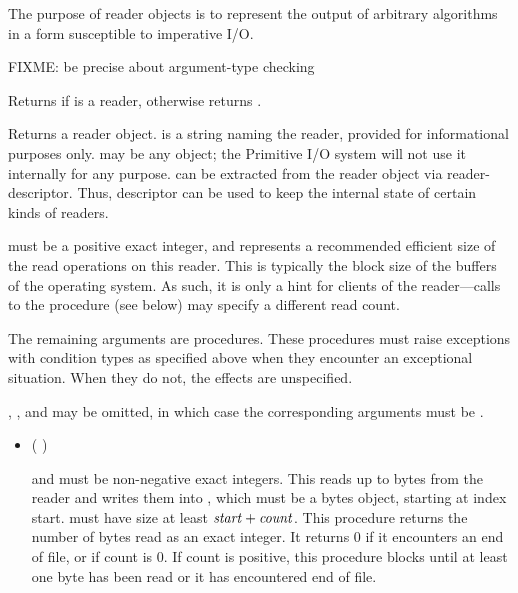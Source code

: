 The purpose of reader objects is to represent the output of arbitrary
algorithms in a form susceptible to imperative I/O.

FIXME: be precise about argument-type checking

\begin{entry}{%
}
   
Returns \schtrue{} if  is a reader, otherwise returns \schfalse.
\end{entry}

\begin{entry}{%
}
   
Returns a reader object.  is a string naming the reader,
provided for informational purposes only.  may be any
object; the Primitive I/O system will not use it internally for any
purpose.  can be extracted from the reader object via
{\cf reader-descriptor}. Thus, descriptor can be used to keep the
internal state of certain kinds of readers.
   
 must be a positive exact integer, and represents a recommended
efficient size of the read operations on this reader. This is typically the
block size of the buffers of the operating system. As such, it is only a
hint for clients of the reader---calls to the  procedure (see below)
may specify a different read count.
   
The remaining arguments are procedures. These procedures must raise
exceptions with condition types as specified above when they encounter an
exceptional situation. When they do not, the effects are unspecified.

, , and  may be
omitted, in which case the corresponding arguments must be \schfalse.
   
\begin{itemize}
\item {\cf (   )}
       
   and  must be non-negative exact integers.
  This reads up to  bytes from the reader and writes them
  into , which must be a bytes object, starting at index
  start.  must have size at least $\var{start} +
  \var{count}$. This procedure returns the number of bytes read as an
  exact integer. It returns 0 if it encounters an end of file, or if
  count is 0. If count is positive, this procedure blocks until at
  least one byte has been read or it has encountered end of file.
  

\end{itemize}
\end{entry}
